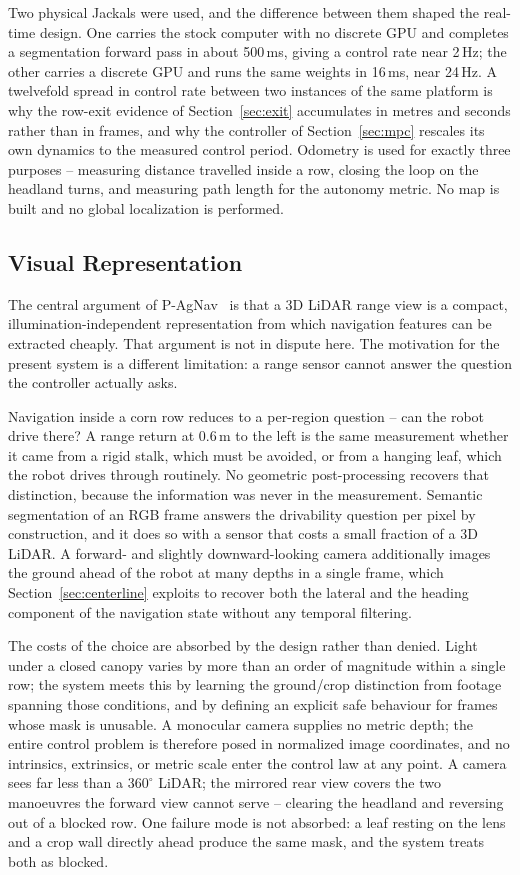 \documentclass[conference]{IEEEtran}
\begin{document}
Two physical Jackals were used, and the difference between them shaped the
real-time design. One carries the stock computer with no discrete GPU and
completes a segmentation forward pass in about 500\,ms, giving a control rate
near 2\,Hz; the other carries a discrete GPU and runs the same weights in 16\,ms,
near 24\,Hz. A twelvefold spread in control rate between two instances of the
same platform is why the row-exit evidence of Section~\ref{sec:exit} accumulates
in metres and seconds rather than in frames, and why the controller of
Section~\ref{sec:mpc} rescales its own dynamics to the measured control period.
Odometry is used for exactly three purposes -- measuring distance travelled
inside a row, closing the loop on the headland turns, and measuring path length
for the autonomy metric. No map is built and no global localization is performed.

\subsection{Visual Representation}
The central argument of P-AgNav~\cite{kim2025pagnav} is that a 3D LiDAR range
view is a compact, illumination-independent representation from which navigation
features can be extracted cheaply. That argument is not in dispute here. The
motivation for the present system is a different limitation: a range sensor
cannot answer the question the controller actually asks.

Navigation inside a corn row reduces to a per-region question -- can the robot
drive there? A range return at 0.6\,m to the left is the same measurement whether
it came from a rigid stalk, which must be avoided, or from a hanging leaf, which
the robot drives through routinely. No geometric post-processing recovers that
distinction, because the information was never in the measurement. Semantic
segmentation of an RGB frame answers the drivability question per pixel by
construction, and it does so with a sensor that costs a small fraction of a 3D
LiDAR. A forward- and slightly downward-looking camera additionally images the
ground ahead of the robot at many depths in a single frame, which
Section~\ref{sec:centerline} exploits to recover both the lateral and the
heading component of the navigation state without any temporal filtering.

The costs of the choice are absorbed by the design rather than denied. Light
under a closed canopy varies by more than an order of magnitude within a single
row; the system meets this by learning the ground/crop distinction from footage
spanning those conditions, and by defining an explicit safe behaviour for frames
whose mask is unusable. A monocular camera supplies no metric depth; the entire
control problem is therefore posed in normalized image coordinates, and no
intrinsics, extrinsics, or metric scale enter the control law at any point. A
camera sees far less than a $360^\circ$ LiDAR; the mirrored rear view covers the
two manoeuvres the forward view cannot serve -- clearing the headland and
reversing out of a blocked row. One failure mode is not absorbed:
a leaf resting on the lens and a crop wall directly ahead produce the same mask,
and the system treats both as blocked.
\end{document}
